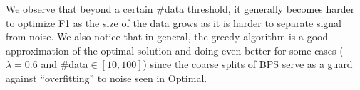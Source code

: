 We observe that beyond a certain \#data threshold, it generally becomes harder to optimize F1 as the size of the data grows as it is harder to separate signal from noise.
We also notice that in general, the greedy algorithm is a good approximation of the optimal solution and doing even better for some cases ($\lambda=0.6$ and \#data$\in [10,100]$) since the coarse splits of BPS serve as a guard against ``overfitting'' to noise seen in Optimal.





